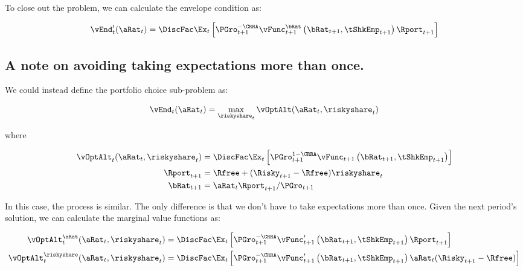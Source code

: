 \documentclass[\econtexRoot/SequentialEGM]{subfiles}
\begin{document}
To close out the problem, we can calculate the envelope condition as:

\begin{equation}
        \vEnd_{t}'(\aRat_{t}) = \DiscFac \Ex_{t} \left[ \PGro_{t+1}^{-\CRRA} \vFunc_{t+1}^{\bRat}\left(\bRat_{t+1}, \tShkEmp_{t+1}\right) \Rport_{t+1}  \right]
\end{equation}

\subsection{A note on avoiding taking expectations more than once.}

We could instead define the portfolio choice sub-problem as:

\begin{equation}
        \vEnd_{t}(\aRat_{t}) = \max_{\riskyshare_{t}} \vOptAlt(\aRat_{t}, \riskyshare_{t})
\end{equation}

where

\begin{equation}
        \begin{split}
                \vOptAlt_{t}(\aRat_{t}, \riskyshare_{t}) & = \DiscFac \Ex_{t} \left[ \PGro_{t+1}^{1-\CRRA} \vFunc_{t+1}\left(\bRat_{t+1}, \tShkEmp_{t+1}\right)   \right] \\
                \Rport_{t+1} & = \Rfree + (\Risky_{t+1} - \Rfree) \riskyshare_{t} \\
                \bRat_{t+1} & = \aRat_{t} \Rport_{t+1} / \PGro_{t+1}
        \end{split}
\end{equation}

In this case, the process is similar. The only difference is that we don't have to take expectations more than once. Given the next period's solution, we can calculate the marginal value functions as:

\begin{equation}
        \begin{split}
                \vOptAlt_{t}^{\aRat}(\aRat_{t}, \riskyshare_{t}) & = \DiscFac \Ex_{t} \left[ \PGro_{t+1}^{-\CRRA} \vFunc_{t+1}'\left(\bRat_{t+1}, \tShkEmp_{t+1}\right) \Rport_{t+1}   \right] \\
                \vOptAlt_{t}^{\riskyshare}(\aRat_{t}, \riskyshare_{t}) & = \DiscFac \Ex_{t} \left[ \PGro_{t+1}^{-\CRRA} \vFunc_{t+1}'\left(\bRat_{t+1}, \tShkEmp_{t+1}\right) \aRat_{t} (\Risky_{t+1} - \Rfree)   \right] \\
        \end{split}
\end{equation}
\end{document}
